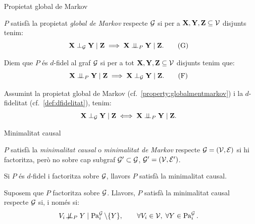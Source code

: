 \documentclass{bestbeamer}
\begin{document}
\begin{frame}{Propietat global de Markov}
\begin{property}\label{property:globalmentmarkov}
$P$ satisfà la propietat \emph{global de Markov} respecte $\mathcal{G}$ si per a $\mathbf{X},\mathbf{Y},\mathbf{Z}\subseteq\mathcal{V}$ disjunts tenim:
\begin{equation}\label{eq:markovglobal}
\mathbf{X}\perp_{\mathcal{G}} \mathbf{Y}\mid \mathbf{Z}\implies \mathbf{X}\perp\!\!\!\perp_P\mathbf{Y}\mid \mathbf{Z}.\tag{G}
\end{equation}
\end{property}
\begin{definition}[$d$-fidelitat]\label{def:dfidelitat}
Diem que $P$ és $d$-fidel al graf $\mathcal{G}$ si per a tot $\mathbf{X},\mathbf{Y},\mathbf{Z}\subseteq\mathcal{V}$ disjunts tenim que:
\begin{equation}\label{eq:fidelitat}
\mathbf{X}\perp\!\!\!\perp_P\mathbf{Y}\mid\mathbf{Z}\implies\mathbf{X}\perp_{\mathcal{G}}\mathbf{Y}\mid\mathbf{Z}.\tag{F}
\end{equation}
\end{definition}
\begin{remark}
Assumint la propietat global de Markov (cf.~\ref{property:globalmentmarkov}) i la $d$-fidelitat (cf.~\ref{def:dfidelitat}), tenim:
\begin{equation*}
\mathbf{X} \perp_{\mathcal{G}} \mathbf{Y} \mid \mathbf{Z} \iff \mathbf{X} \perp\!\!\!\perp_P \mathbf{Y} \mid \mathbf{Z}.
\end{equation*}
\end{remark}
\end{frame}

\begin{frame}{Minimalitat causal}
\small
\begin{definition}\label{def:minimalitat}
$P$ satisfà la \textit{minimalitat causal} o \textit{minimalitat de Markov} respecte $\mathcal{G}=(\mathcal{V},\mathcal{E})$ si hi factoritza, però no sobre cap subgraf $\mathcal{G}'\subset\mathcal{G}$, $\mathcal{G}'=(\mathcal{V},\mathcal{E}')$.
\end{definition}
\begin{prop}\label{prop:minimalitat}
Si $P$ és $d$-fidel i factoritza sobre $\mathcal{G}$, llavors $P$ satisfà la minimalitat causal.
\end{prop}
\begin{prop}\label{prop:equivminimalitat}
Suposem que $P$ factoritza sobre $\mathcal{G}$. Llavors, $P$ satisfà la minimalitat causal respecte $\mathcal{G}$ si, i només si:
\begin{equation*}
V_i\not\!\perp\!\!\!\perp_P Y\mid\operatorname{Pa}_i^{\mathcal{G}}\setminus\{Y\}, \qquad \forall V_i\in\mathcal{V}, \; \forall Y\in\operatorname{Pa}_i^{\mathcal{G}}.
\end{equation*}
\end{prop}
\end{frame}
\end{document}
